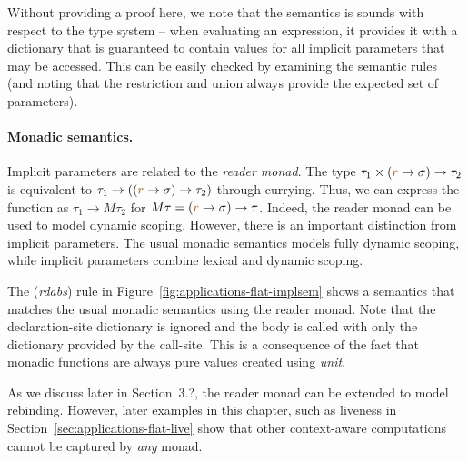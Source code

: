 Without providing a proof here, we note that the semantics is sounds with respect to the type 
system -- when evaluating an expression, it provides it with a dictionary that is guaranteed to
contain values for all implicit parameters that may be accessed. This can be easily checked by
examining the semantic rules (and noting that the restriction and union always provide the
expected set of parameters).

\paragraph{Monadic semantics.}
Implicit parameters are related to the \emph{reader mo\-nad}. The type 
$\tau_1 \times (\aclrd{r} \rightarrow \sigma) \rightarrow \tau_2$ is equivalent to
$\tau_1 \rightarrow ((\aclrd{r} \rightarrow \sigma) \rightarrow \tau_2)$ through currying. Thus, we can
express the function as $\tau_1 \rightarrow M\tau_2$ for $M\tau = (\aclrd{r} \rightarrow \sigma) \rightarrow \tau$.
Indeed, the reader monad can be used to model dynamic scoping. However, there is an important distinction
from implicit parameters. The usual monadic semantics models fully dynamic scoping, while implicit
parameters combine lexical and dynamic scoping.

The (\emph{rdabs}) rule in Figure~\ref{fig:applications-flat-implsem} shows a semantics that
matches the usual monadic semantics using the reader monad. Note that the declaration-site dictionary
is ignored and the body is called with only the dictionary provided by the call-site. This is
a consequence of the fact that monadic functions are always pure values created using \emph{unit}.

As we discuss later in Section~3.?, the reader monad can be extended to model rebinding.
However, later examples in this chapter, such as liveness in Section~\ref{sec:applications-flat-live}
show that other context-aware computations cannot be captured by \emph{any} monad.


